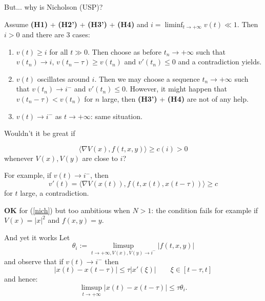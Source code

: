 \documentclass{beamer}
\begin{document}
\begin{frame}{But... why is Nicholson (USP)?}
    
    Assume {\bf (H1)} +     {\bf (H2')} +     {\bf (H3')} +     {\bf (H4)} and $i=\liminf_{t\to+\infty} v(t) \ll 1$. Then $i>0$ and there are 3 cases: 
    \medskip 
    
\begin{enumerate}
    \item $v(t)\ge i$ for all $t\gg 0$. Then choose as before
        $t_n\to +\infty$ such that $v(t_n) \to i$, $v(t_n-\tau) \ge v(t_n)$ and $v'(t_n)\le 0$ and a contradiction yields.
        \pause 
       \item 
 $v(t)$ oscillates around $i$. Then we may choose 
    a sequence $t_n\to +\infty$ such that $v(t_n)\to i^-$  and $v'(t_n)\le 0$. However, it might happen that $v(t_n-\tau)< v(t_n)$ for $n$ large, then     {\bf (H3')} + {\bf (H4)} are not of any help.
 \pause  
   \item  
  $v(t)\to i^-$ as $t\to+\infty$: same situation.
    
\end{enumerate}       
    

    
     
    
\end{frame}

\begin{frame}{
}
 Wouldn't it be great if 
 
 $$\langle \nabla V(x),f(t,x,y)\rangle \ge c(i)>0
 $$
 whenever $V(x), V(y)$ are close to $i$? 
 \medskip 
 
 
 For example, if 
 $v(t)\to i^-$, then 
 $$v'(t)=\langle \nabla V(x(t)),f(t,x(t),x(t-\tau))\rangle \ge c
 $$
 for $t$ large, a contradiction. 
\medskip 

\pause 
\textbf{OK} for (\ref{nich}) but too ambitious when $N>1$:
the condition fails for example if $V(x)=|x|^2$ and $f(x,y)=y$.

\end{frame}

\begin{frame}{And yet it works
}
Let 
  $$\theta_i:= \limsup_{t\to+\infty, V(x), V(y)\to i^-} |f(t,x,y)|
$$
and observe that if $v(t)\to i^-$ then 
$$|x(t)-x(t-\tau)|\le \tau |x'(\xi)|\qquad \xi \in [t-\tau,t]$$
and hence: 
$$
\limsup_{t\to+\infty} |x(t)-x(t-\tau)| \le \tau \theta_i.
$$


\end{frame}
\end{document}
